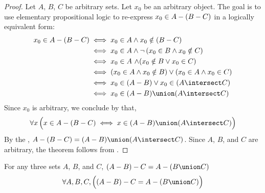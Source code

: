 \begin{proof}
    Let \( A \), \( B \), \( C \) be arbitrary sets. Let \( x_{0} \) be an arbitrary object.
    The goal is to use elementary propositional logic to re-express \( x_{0} \in A - \mleft( B - C \mright) \)
    in a logically equivalent form:
    \begin{align*}
        x_{0} \in A - \mleft( B - C \mright)
        &\iff
        x_{0} \in A \land x_{0} \notin \mleft( B - C \mright) \\
        &\iff
        x_{0} \in A \land \lnot \, \mleft( x_{0} \in B \land x_{0} \notin C \mright)\\
        &\iff
        x_{0} \in A \,\,{\land} \mleft( x_{0} \notin B \lor x_{0} \in C \mright)\\
        &\iff
        \mleft( x_{0} \in A \land x_{0} \notin B \mright) \lor
        \mleft( x_{0} \in A \land x_{0} \in C \mright)\\
        &\iff
        x_{0} \in \mleft( A - B \mright) \lor x_{0} \in \mleft( A \intersect C \mright) \\
        &\iff
        x_{0} \in \mleft( A - B \mright) \union \mleft( A \intersect C \mright)
    \end{align*}
    Since \( x_{0} \) is arbitrary, we conclude by  that,
    \begin{equation*}
        \forall x \, \Big( x \in A - \mleft( B - C \mright) \iff
        x \in \mleft( A - B \mright) \union \mleft( A \intersect C \mright) \Big)
    \end{equation*}
    By the , \( A - \mleft( B - C \mright) =
    \mleft( A - B \mright) \union \mleft( A \intersect C \mright) \). Since \( A \), \( B \),
    and \( C \) are arbitrary, the theorem follows from .
\end{proof}

\begin{thm}
    \label{set-identities:subtract-C-from-A-minus-B}
    For any three sets \( A \), \( B \), and \( C \), \( \mleft( A - B \mright) - C = A - \mleft( B \union C \mright) \)
    \begin{equation*}
        \forall A,B,C , \Big( \mleft( A - B \mright) - C = A - \mleft( B \union C \mright) \Big)
    \end{equation*}
\end{thm}

